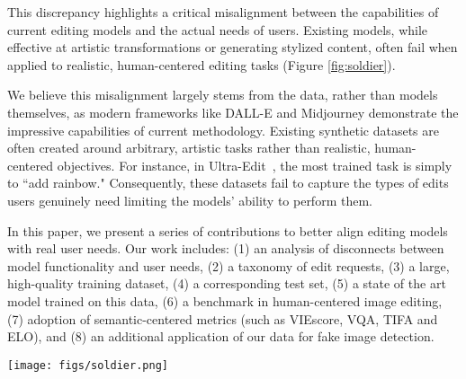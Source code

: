 This discrepancy highlights a critical misalignment between the capabilities of current editing models and the actual needs of users. Existing models, while effective at artistic transformations or generating stylized content, often fail when applied to realistic, human-centered editing tasks (Figure \ref{fig:soldier}).

We believe this misalignment largely stems from the data, rather than models themselves, as modern frameworks like DALL-E and Midjourney demonstrate the impressive capabilities of current methodology. Existing synthetic datasets are often created around arbitrary, artistic tasks rather than realistic, human-centered objectives. For instance, in Ultra-Edit~\cite{zhao2024ultraedit}, the most trained task is simply to ``add rainbow." Consequently, these datasets fail to capture the types of edits users genuinely need limiting the models' ability to perform them.


In this paper, we present a series of contributions to better align editing models with real user needs. Our work includes: (1) an analysis of disconnects between model functionality and user needs, (2) a taxonomy of edit requests, (3) a large, high-quality training dataset, (4) a corresponding test set, (5) a state of the art model trained on this data, (6) a benchmark in human-centered image editing, (7) adoption of semantic-centered metrics (such as VIEscore\cite{ku2023viescore}, VQA, TIFA and ELO), and (8) an additional application of our data for fake image detection.



\begin{figure*}[!h]
    \centering
    \texttt{[image: figs/soldier.png]}
    \caption{Baselines struggle on simple tasks}
    \label{fig:soldier}
\end{figure*}







